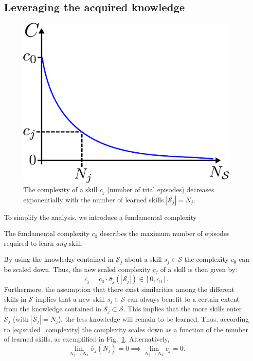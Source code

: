 \subsection{Leveraging the acquired knowledge}
\begin{figure}[!t]
	\centering
	\includegraphics[width=0.7\columnwidth]{fig/complexity_per_cardinality.pdf}
	\caption{The complexity of a skill $c_j$ (number of trial episodes) decreases exponentially with the number of learned skills $|\mathcal{S}_j|=N_{j}$.}
	\label{fig:complexity_per_cardinality}
\end{figure}
To simplify the analysis, we introduce a fundamental complexity
\begin{tcolorbox}
\begin{assumption}\label{definition:joint_grouping} The fundamental complexity $c_0$ describes the maximum number of episodes required to learn \emph{any} skill.
\end{assumption}
\end{tcolorbox}
By using the knowledge contained in $\mathcal{S}_j$ about a skill $s_j \in \mathcal{S}$ the complexity $c_{0}$ can be scaled down. Thus, the new scaled complexity $c_j$ of a skill is then given by:
\begin{equation}\label{eq:scaled_complexity}
c_j = c_{0} \cdot \bar{\sigma}_{j}\left(|\mathcal{S}_j|\right)\in [0, c_{0}].
\end{equation}
Furthermore, the assumption that there exist similarities among the different skills in $\mathcal{S}$ implies that a new skill $s_j \in \mathcal{S}$ can always benefit to a certain extent from the knowledge contained in $\mathcal{S}_j \subset \mathcal{S}$. This implies that the more skills enter $\mathcal{S}_j$ (with $|\mathcal{S}_j| = N_j$), the less knowledge will remain to be learned. Thus, according to \eqref{eq:scaled_complexity} the complexity scales down as a function of the number of learned skills, as exemplified in Fig.~\ref{fig:complexity_per_cardinality}. Alternatively,
\begin{equation}\label{eq:knowledge_limit}
    \lim_{N_{j}\to N_{\mathcal{S}}} \bar{\sigma}_j(N_j) = 0 \implies \lim_{N_{j}\to N_{\mathcal{S}}} c_j = 0.
\end{equation}

